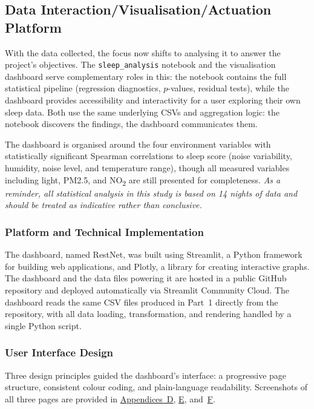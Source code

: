 \documentclass[10pt,a4paper]{extarticle}
\begin{document}
\subsection{Data Interaction/Visualisation/Actuation Platform}

With the data collected, the focus now shifts to analysing it to answer the project's objectives. The \texttt{sleep\_analysis} notebook and the visualisation dashboard serve complementary roles in this: the notebook contains the full statistical pipeline (regression diagnostics, $p$-values, residual tests), while the dashboard provides accessibility and interactivity for a user exploring their own sleep data. Both use the same underlying CSVs and aggregation logic: the notebook discovers the findings, the dashboard communicates them.

The dashboard is organised around the four environment variables with statistically significant Spearman correlations to sleep score (noise variability, humidity, noise level, and temperature range), though all measured variables including light, PM2.5, and NO\textsubscript{2} are still presented for completeness. \textit{As a reminder, all statistical analysis in this study is based on 14 nights of data and should be treated as indicative rather than conclusive.}

\subsubsection{Platform and Technical Implementation}

The dashboard, named RestNet, was built using Streamlit, a Python framework for building web applications, and Plotly, a library for creating interactive graphs. The dashboard and the data files powering it are hosted in a public GitHub repository and deployed automatically via Streamlit Community Cloud. The dashboard reads the same CSV files produced in Part~1 directly from the repository, with all data loading, transformation, and rendering handled by a single Python script.

\subsubsection{User Interface Design}

Three design principles guided the dashboard's interface: a progressive page structure, consistent colour coding, and plain-language readability. Screenshots of all three pages are provided in \hyperref[app:D]{Appendices~D}, \hyperref[app:E]{E}, and~\hyperref[app:F]{F}.
\end{document}
